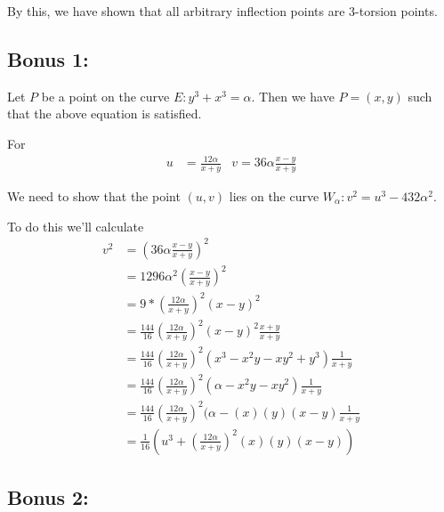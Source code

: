 \documentclass[12pt,letterpaper]{article}
\begin{document}
    By this, we have shown that all arbitrary inflection points are 3-torsion points.
\subsection*{Bonus 1:}

    Let $P$ be a point on the curve $E : y^3 + x^3 = \alpha$. Then we have $P=(x,y)$ such that the above equation is satisfied.
    
    For 
    \begin{align*}
      u &= \frac{12\alpha}{x+y} & v = 36\alpha\frac{x-y}{x+y}
    \end{align*}
    
    We need to show that the point $(u,v)$ lies on the curve $W_\alpha : v^2 = u^3 - 432\alpha^2$.
    
    To do this we'll calculate 
    \begin{align*}
        v^2 &= \left(36\alpha\frac{x-y}{x+y}\right)^2\\
        &= 1296\alpha^2\left(\frac{x-y}{x+y}\right)^2\\
        &= 9 * \left(\frac{12\alpha}{x+y}\right)^2\left( x-y\right)^2\\
        &= \frac{144}{16}\left(\frac{12\alpha}{x+y}\right)^2 \left(x-y\right)^2\frac{x+y}{x+y}\\
        &= \frac{144}{16}\left(\frac{12\alpha}{x+y}\right)^2(x^3 - x^2 y - x y^2 + y^3)\frac{1}{x+y} \\
        &= \frac{144}{16}\left(\frac{12\alpha}{x+y}\right)^2(\alpha - x^2 y - x y^2)\frac{1}{x+y}\\
        &= \frac{144}{16}\left(\frac{12\alpha}{x+y}\right)^2(\alpha - (x)(y)(x-y)\frac{1}{x+y}\\
        &= \frac{1}{16}\left( u^3 + \left(\frac{12\alpha}{x+y}\right)^2(x)(y)(x-y)\right)
    \end{align*}
    

\subsection*{Bonus 2:}
    
    
\end{document}
